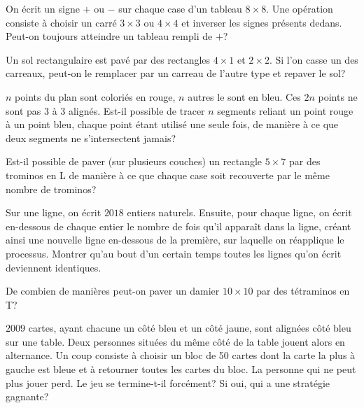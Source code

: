 \begin{exo}
On écrit un signe $+$ ou $-$ sur chaque case d'un tableau $8\times8$. Une opération consiste à choisir un carré $3\times3$ ou $4\times4$ et inverser les signes présents dedans. Peut-on toujours atteindre un tableau rempli de $+$?
\end{exo}

\begin{exo}
Un sol rectangulaire est pavé par des rectangles $4\times1$ et $2\times2$. Si l'on casse un des carreaux, peut-on le remplacer par un carreau de l'autre type et repaver le sol?
\end{exo}

\begin{exo}
$n$ points du plan sont coloriés en rouge, $n$ autres le sont en bleu. Ces $2n$ points ne sont pas $3$ à $3$ alignés. Est-il possible de tracer $n$ segments reliant un point rouge à un point bleu, chaque point étant utilisé une seule fois, de manière à ce que deux segments ne s'intersectent jamais?
\end{exo}

\begin{exo}
Est-il possible de paver (sur plusieurs couches) un rectangle $5\times 7$ par des trominos en L de manière à ce que chaque case soit recouverte par le même nombre de trominos?
\end{exo}

\begin{exo}
Sur une ligne, on écrit $2018$ entiers naturels. Ensuite, pour chaque ligne, on écrit en-dessous de chaque entier le nombre de fois qu'il apparaît dans la ligne, créant ainsi une nouvelle ligne en-dessous de la première, sur laquelle on réapplique le processus. Montrer qu'au bout d'un certain temps toutes les lignes qu'on écrit deviennent identiques.
\end{exo}

\begin{exo}
De combien de manières peut-on paver un damier $10\times10$ par des tétraminos en T?
\end{exo}

\begin{exo}
$2009$ cartes, ayant chacune un côté bleu et un côté jaune, sont alignées côté bleu sur une table. Deux personnes situées du même côté de la table jouent alors en alternance. Un coup consiste à choisir un bloc de 50 cartes dont la carte la plus à gauche est bleue et à retourner toutes les cartes du bloc. La personne qui ne peut plus jouer perd. Le jeu se termine-t-il forcément? Si oui, qui a une stratégie gagnante?
\end{exo}

